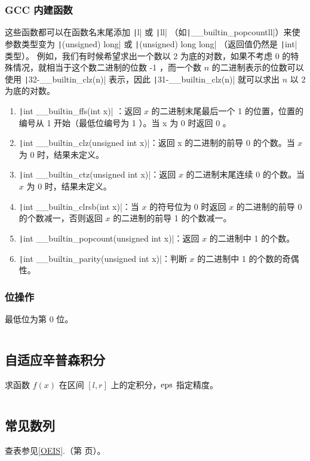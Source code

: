 \documentclass[a4paper, twoside]{article}
\newcommand\detailedref[1]{\ref{#1}.\nameref{#1}（第 \pageref{#1} 页）}
\begin{document}
    \subsubsection{GCC 内建函数}
    这些函数都可以在函数名末尾添加 \texttt|l| 或 \texttt|ll| （如\texttt|__builtin_popcountll|）来使参数类型变为 \texttt|(unsigned) long| 或 \texttt|(unsigned) long long| （返回值仍然是 \texttt|int| 类型）。 例如，我们有时候希望求出一个数以 2 为底的对数，如果不考虑 0 的特殊情况，就相当于这个数二进制的位数 -1 ，而一个数 $n$ 的二进制表示的位数可以使用 \texttt|32-__builtin_clz(n)| 表示，因此 \texttt|31-__builtin_clz(n)| 就可以求出 $n$ 以 2 为底的对数。
    \begin{enumerate}
        \item \texttt|int __builtin_ffs(int x)| ：返回 $x$ 的二进制末尾最后一个 1 的位置，位置的编号从 1 开始（最低位编号为 1 ）。当 x 为 0 时返回 0 。
        \item \texttt|int __builtin_clz(unsigned int x)|：返回 x 的二进制的前导 0 的个数。当 $x$ 为 0 时，结果未定义。
        \item \texttt|int __builtin_ctz(unsigned int x)|：返回 $x$ 的二进制末尾连续 0 的个数。当 $x$ 为 0 时，结果未定义。
        \item \texttt|int __builtin_clrsb(int x)|：当 $x$ 的符号位为 0 时返回 $x$ 的二进制的前导 0 的个数减一，否则返回 $x$ 的二进制的前导 1 的个数减一。
        \item \texttt|int __builtin_popcount(unsigned int x)|：返回 $x$ 的二进制中 1 的个数。
        \item \texttt|int __builtin_parity(unsigned int x)|：判断 $x$ 的二进制中 1 的个数的奇偶性。
    \end{enumerate}

    \subsubsection{位操作}
    最低位为第 $0$ 位。
    \inputminted{cpp}{../src/数学/二进制相关.cpp}

\subsection{自适应辛普森积分}
求函数 $f(x)$ 在区间 $[l, r]$ 上的定积分，$\rm{eps}$ 指定精度。
\inputminted{cpp}{../src/数学/自适应辛普森积分.cpp}
    
\subsection{常见数列}
查表参见\detailedref{OEIS}。
\end{document}
